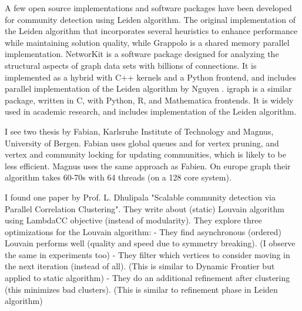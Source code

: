 A few open source implementations and software packages have been developed for community detection using Leiden algorithm. The original implementation of the Leiden algorithm \cite{com-traag19} that incorporates several heuristics to enhance performance while maintaining solution quality, while Grappolo \cite{com-halappanavar17} is a shared memory parallel implementation. NetworKit \cite{staudt2016networkit} is a software package designed for analyzing the structural aspects of graph data sets with billions of connections. It is implemented as a hybrid with C++ kernels and a Python frontend, and includes parallel implementation of the Leiden algorithm by Nguyen \cite{nguyenleiden}. igraph \cite{csardi2006igraph} is a similar package, written in C, with Python, R, and Mathematica frontends. It is widely used in academic research, and includes implementation of the Leiden algorithm.


I see two thesis by Fabian, Karlsruhe Institute of Technology and Magnus, University of Bergen. Fabian uses global queues and for vertex pruning, and vertex and community locking for updating communities, which is likely to be less efficient. Magnus uses the same approach as Fabien. On europe graph their algorithm takes 60-70s with 64 threads (on a 128 core system).

I found one paper by Prof. L. Dhulipala "Scalable community detection via Parallel Correlation Clustering". They write about (static) Louvain algorithm using LambdaCC objective (instead of modularity). They explore three optimizations for the Louvain algorithm:
- They find asynchronous (ordered) Louvain performs well (quality and speed due to symmetry breaking).
(I observe the same in experiments too)
- They filter which vertices to consider moving in the next iteration (instead of all).
(This is similar to Dynamic Frontier but applied to static algorithm)
- They do an additional refinement after clustering (this minimizes bad clusters).
(This is similar to refinement phase in Leiden algorithm)




